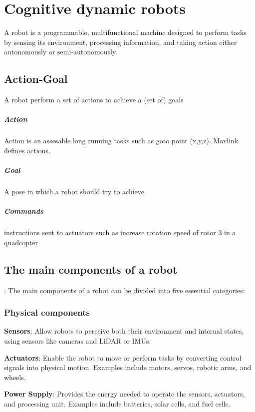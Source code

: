 \chapter{Cognitive dynamic robots}
A robot is a programmable, multifunctional machine designed to perform tasks by sensing its environment, processing information, and taking action either autonomously or semi-autonomously.

\section{Action-Goal}
    A robot perform a set of actions to achieve a (set of) goals
    \paragraph{Action}
        Action is an assesable long running tasks such as goto point (x,y,z). Mavlink defines actions.
    \paragraph{Goal}
        A pose in which a robot should try to achieve
    \paragraph{Commands}
        instructions sent to actuators such as increase rotation speed of rotor 3 in a quadcopter

\section{The main components of a robot}:
The main components of a robot can be divided into five essential categories:

    \subsection{Physical components}
        \textbf{Sensors}: Allow robots to perceive both their environment and internal states, using sensors like cameras and LiDAR or IMUs.

        \textbf{Actuators}: Enable the robot to move or perform tasks by converting control signals into physical motion.
        Examples include motors, servos, robotic arms, and wheels.

        \textbf{Power Supply}: Provides the energy needed to operate the sensors, actuators, and processing unit.
        Examples include batteries, solar cells, and fuel cells.

